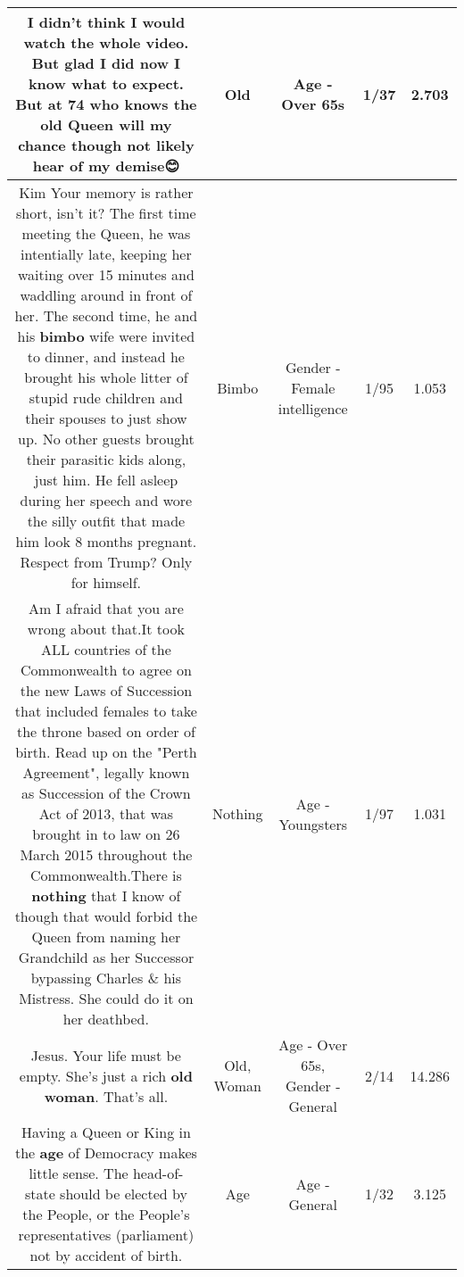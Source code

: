 \documentclass[11pt]{article}
\newlength\mylength
\begin{document}
\begin{center}
\begin{longtable}{|C{.65\mylength}|C{.30\mylength}|C{.12\mylength}|C{.12\mylength}|C{.12\mylength}|}
  \small I didn't think I would watch the whole video. But  glad I did now I know what to expect. But at 74 who knows the \textbf{old} Queen will my chance though not likely hear of my demise😊\normalsize   & Old & Age - Over 65s & 1/37 & 2.703 \\  \hline
  \small Kim  Your memory is rather short, isn't it?  The first time meeting the Queen, he was intentially late, keeping her waiting over 15 minutes and waddling around in front of her.  The second time, he and his \textbf{bimbo} wife were invited to dinner, and instead he brought his whole litter of stupid rude children and their spouses to just show up.  No other guests brought their parasitic kids along, just him.  He fell asleep during her speech and wore the silly outfit that made him look 8 months pregnant.  Respect from Trump?  Only for himself.\normalsize   & Bimbo & Gender - Female intelligence & 1/95 & 1.053 \\  \hline
  \small Am I afraid that you are wrong about that.It took ALL countries of the Commonwealth to agree on the new Laws of Succession that included females to take the throne based on order of birth. Read up on the "Perth Agreement", legally known as Succession of the Crown Act of 2013, that was brought in to law on 26 March 2015 throughout the Commonwealth.There is \textbf{nothing} that I know of though that would forbid the Queen from naming her Grandchild as her Successor bypassing Charles \& his Mistress. She could do it on her deathbed.\normalsize   & Nothing & Age - Youngsters & 1/97 & 1.031 \\  \hline
  \small Jesus. Your life must be empty. She's just a rich \textbf{old} \textbf{woman}. That's all.\normalsize   & Old, Woman & Age - Over 65s, Gender - General & 2/14 & 14.286 \\  \hline
  \small Having a Queen or King in the \textbf{age} of Democracy makes little sense.  The head-of-state should be elected by the People, or the People's representatives (parliament) not by accident of birth.\normalsize   & Age & Age - General & 1/32 & 3.125 \\  \hline

\end{longtable}
\end{center}
\end{document}
